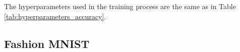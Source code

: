     The hyperparameters used in the training process are the same as in Table \ref{tab:hyperparameters_accuracy}.

    \subsection{Fashion MNIST}
    \label{appendix:energy_neuromorphic_fashion_mnist}

